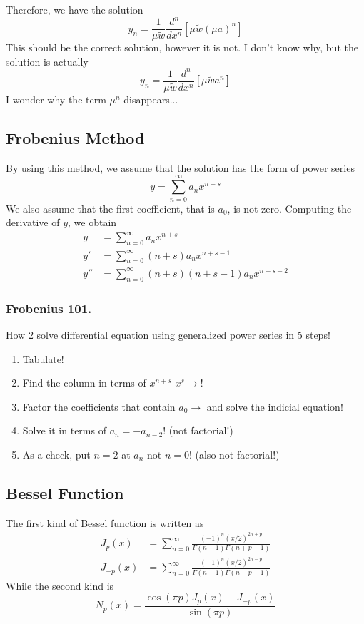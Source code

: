 \documentclass[../../../main.tex]{subfiles}
\begin{document}
Therefore, we have the solution
\begin{equation*}
    y_n=\frac{1}{\mu\tilde{w}}\frac{d^n}{dx^n}[\mu\tilde{w}(\mu a)^n]
\end{equation*}
This should be the correct solution, however it is not.
I don't know why, but the solution is actually
\begin{equation*}
    y_n=\frac{1}{\mu\tilde{w}}\frac{d^n}{dx^n}[\mu\tilde{w}a^n]
\end{equation*}
I wonder why the term $\mu^n$ disappears...

\subsection{Frobenius Method}
By using this method, we assume that the solution has the form of power series
\begin{equation*}
    y=\sum_{n=0}^{\infty} a_nx^{n+s}
\end{equation*}
We also assume that the first coefficient, that is $a_0$, is not zero.
Computing the derivative of $y$, we obtain
\begin{align*}
    y   & =\sum_{n=0}^{\infty} a_nx^{n+s}                \\
    y'  & =\sum_{n=0}^{\infty} (n+s) a_nx^{n+s-1}        \\
    y'' & =\sum_{n=0}^{\infty} (n+s) (n+s-1)a_nx^{n+s-2}
\end{align*}

\subsubsection{Frobenius 101.} How 2 solve differential equation using generalized power series in 5 steps!
\begin{enumerate}
    \item Tabulate!
    \item Find the column in terms of $x^{n+s}$ $x^s\rightarrow$!
    \item Factor the coefficients that contain $a_0\rightarrow$ and solve the indicial equation!
    \item Solve it in terms of $a_n=-a_{n-2}$! (not factorial!)
    \item As a check, put $n=2$ at $a_n$ not $n=0$! (also not factorial!)
\end{enumerate}

\subsection{Bessel Function}
The first kind of Bessel function is written as
\begin{align*}
    J_p(x)     & =\sum_{n=0}^{\infty}\frac{(-1)^n(x/2)^{2n+p}}{\Gamma(n+1)\Gamma(n+p+1)} \\
    J_{-p} (x) & =\sum_{n=0}^{\infty}\frac{(-1)^n(x/2)^{2n-p}}{\Gamma(n+1)\Gamma(n-p+1)}
\end{align*}
While the second kind is
\begin{equation*}
    N_p(x)=\frac{\cos(\pi p)J_p(x)-J_{-p}(x)}{\sin(\pi p)}
\end{equation*}
\end{document}
